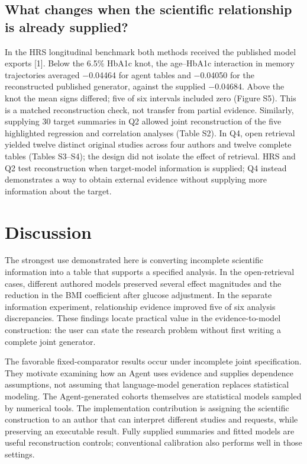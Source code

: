 \documentclass[11pt,letterpaper]{article}
\begin{document}
\subsection{What changes when the scientific relationship is already supplied?}

In the HRS longitudinal benchmark both methods received the published model exports [1]. Below the 6.5\% HbA1c knot, the age–\allowbreak{}HbA1c interaction in memory trajectories averaged −0.04464 for agent tables and −0.04050 for the reconstructed published generator, against the supplied −0.04684. Above the knot the mean signs differed; five of six intervals included zero (Figure S5). This is a matched reconstruction check, not transfer from partial evidence. Similarly, supplying 30 target summaries in Q2 allowed joint reconstruction of the five highlighted regression and correlation analyses (Table S2). In Q4, open retrieval yielded twelve distinct original studies across four authors and twelve complete tables (Tables S3–\allowbreak{}S4); the design did not isolate the effect of retrieval. HRS and Q2 test reconstruction when target-model information is supplied; Q4 instead demonstrates a way to obtain external evidence without supplying more information about the target.


\section{Discussion}

The strongest use demonstrated here is converting incomplete scientific information into a table that supports a specified analysis. In the open-retrieval cases, different authored models preserved several effect magnitudes and the reduction in the BMI coefficient after glucose adjustment. In the separate information experiment, relationship evidence improved five of six analysis discrepancies. These findings locate practical value in the evidence-to-model construction: the user can state the research problem without first writing a complete joint generator.


The favorable fixed-comparator results occur under incomplete joint specification. They motivate examining how an Agent uses evidence and supplies dependence assumptions, not assuming that language-model generation replaces statistical modeling. The Agent-generated cohorts themselves are statistical models sampled by numerical tools. The implementation contribution is assigning the scientific construction to an author that can interpret different studies and requests, while preserving an executable result. Fully supplied summaries and fitted models are useful reconstruction controls; conventional calibration also performs well in those settings.
\end{document}
